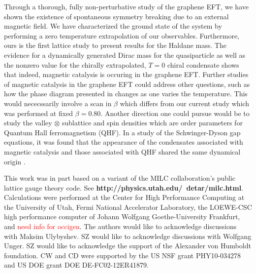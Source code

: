 \documentclass[aps,prd,twocolumn,showpacs,superscriptaddress,groupedaddress]{revtex4}  %
\begin{document}
Through a thorough, fully non-perturbative study of the graphene EFT, we have shown the existence of spontaneous symmetry breaking due to an external magnetic field.
We have characterized the ground state of the system by performing a zero temperature extrapolation of our observables. Furthermore, ours is the first lattice study to present results 
for the Haldane mass. The evidence for a dynamically generated Dirac mass for the quasiparticle as well as the nonzero value for the chirally extrapolated, $T=0$ chiral condensate shows
that indeed, magnetic catalysis is occuring in the graphene EFT. Further studies of magnetic catalysis in the graphene EFT could address other questions, such as how the phase diagram presented in \cite{Polikarpov} changes as one varies the temperature.
This would nececssarily involve a scan in $\beta$ which differs from our current study which was performed at fixed $\beta=0.80$. Another direction one could pursue would be to 
study the valley $\otimes$ sublattice and spin densities which are order parameters for Quantum Hall ferromagnetism (QHF). In a study of the Schwinger-Dyson gap equations, it was found that 
the appearance of the condensates associated with magnetic catalysis and those associated with QHF shared the same dynamical origin \cite{MiranskyGraphene2}.


\acknowledgements
This work was in part based on a variant of the MILC collaboration's public lattice gauge theory code. See {\bf http://physics.utah.edu/~detar/milc.html}.
Calculations were performed at the Center for High Performance Computing at the University of Utah, Fermi National Accelerator Laboratory, the LOEWE-CSC high performance
computer of Johann Wolfgang Goethe-University Frankfurt, and \textcolor{red}{need info for occigen}. The authors would like to acknowledge discussions with Maksim Ulybyshev. SZ would like to
acknowledge discussions with Wolfgang Unger.
SZ would like to acknowledge the support of the Alexander von Humboldt foundation. CW and CD were supported by the US NSF grant PHY10-034278 and US DOE grant DOE DE-FC02-12ER41879.

\appendix
\end{document}
